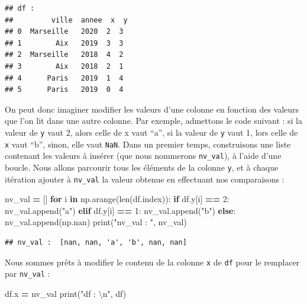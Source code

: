 \documentclass[12pt,]{book}
\newenvironment{Shaded}{\begin{snugshade}}{\end{snugshade}}
\newcommand{\KeywordTok}[1]{\textcolor[rgb]{0.13,0.29,0.53}{\textbf{#1}}}
\newcommand{\DecValTok}[1]{\textcolor[rgb]{0.00,0.00,0.81}{#1}}
\newcommand{\CharTok}[1]{\textcolor[rgb]{0.31,0.60,0.02}{#1}}
\newcommand{\StringTok}[1]{\textcolor[rgb]{0.31,0.60,0.02}{#1}}
\newcommand{\ControlFlowTok}[1]{\textcolor[rgb]{0.13,0.29,0.53}{\textbf{#1}}}
\newcommand{\OperatorTok}[1]{\textcolor[rgb]{0.81,0.36,0.00}{\textbf{#1}}}
\newcommand{\BuiltInTok}[1]{#1}
\newcommand{\NormalTok}[1]{#1}
\numberwithin{equation}{section}
\numberwithin{countremarque}{section}
\begin{document}
\begin{lstlisting}
## df : 
##         ville  annee  x  y
## 0  Marseille   2020  2  3
## 1        Aix   2019  3  3
## 2  Marseille   2018  4  2
## 3        Aix   2018  2  1
## 4      Paris   2019  1  4
## 5      Paris   2019  0  4
\end{lstlisting}

On peut donc imaginer modifier les valeurs d'une colonne en fonction des
valeurs que l'on lit dans une autre colonne. Par exemple, admettons le
code suivant : si la valeur de \texttt{y} vaut 2, alors celle de x vaut
``a'', si la valeur de \texttt{y} vaut 1, lors celle de \texttt{x} vaut
``b'', sinon, elle vaut \texttt{NaN}. Dans un premier temps,
construisons une liste contenant les valeurs à insérer (que nous
nommerons \texttt{nv\_val}), à l'aide d'une boucle. Nous allons
parcourir tous les éléments de la colonne \texttt{y}, et à chaque
itération ajouter à \texttt{nv\_val} la valeur obtenue en effectuant nos
comparaisons :

\begin{Shaded}
\begin{Highlighting}[]
\NormalTok{nv_val }\OperatorTok{=}\NormalTok{ []}
\ControlFlowTok{for}\NormalTok{ i }\KeywordTok{in}\NormalTok{ np.arange(}\BuiltInTok{len}\NormalTok{(df.index)):}
        \ControlFlowTok{if}\NormalTok{ df.y[i] }\OperatorTok{==} \DecValTok{2}\NormalTok{:}
\NormalTok{            nv_val.append(}\StringTok{"a"}\NormalTok{)}
        \ControlFlowTok{elif}\NormalTok{ df.y[i] }\OperatorTok{==} \DecValTok{1}\NormalTok{:}
\NormalTok{            nv_val.append(}\StringTok{"b"}\NormalTok{)}
        \ControlFlowTok{else}\NormalTok{:}
\NormalTok{            nv_val.append(np.nan)}
\BuiltInTok{print}\NormalTok{(}\StringTok{"nv_val : "}\NormalTok{, nv_val)}
\end{Highlighting}
\end{Shaded}

\begin{lstlisting}
## nv_val :  [nan, nan, 'a', 'b', nan, nan]
\end{lstlisting}

Nous sommes prêts à modifier le contenu de la colonne \texttt{x} de
\texttt{df} pour le remplacer par \texttt{nv\_val} :

\begin{Shaded}
\begin{Highlighting}[]
\NormalTok{df.x }\OperatorTok{=}\NormalTok{ nv_val}
\BuiltInTok{print}\NormalTok{(}\StringTok{"df : }\CharTok{\textbackslash{}n}\StringTok{"}\NormalTok{, df)}
\end{Highlighting}
\end{Shaded}
\end{document}

